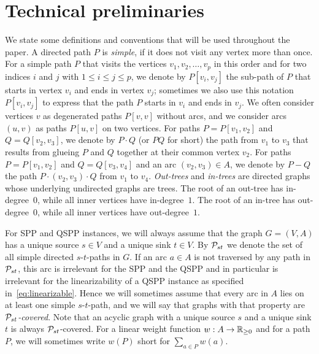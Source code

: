 \documentclass[11pt,fleqn]{article}
\begin{document}
\section{Technical preliminaries}
\label{sec:preliminearies}
We state some definitions and conventions that will be used throughout the paper.
A directed path $P$ is \emph{simple}, if it does not visit any vertex more than once.
For a simple path $P$ that visits the vertices $v_1,v_2,\ldots,v_p$ in this order and 
for two indices $i$ and $j$ with $1\le i\le j\le p$, we denote by $P[v_i,v_j]$ the 
sub-path of $P$ that starts in vertex $v_i$ and ends in vertex $v_j$;
sometimes we also use this notation $P[v_i,v_j]$ to express that the path $P$ starts 
in $v_i$ and ends in $v_j$.
We often consider vertices $v$ as degenerated paths $P[v,v]$ without arcs,
and we consider arcs $(u,v)$ as paths $P[u,v]$ on two vertices.
For paths $P=P[v_1,v_2]$ and $Q=Q[v_2,v_3]$, we denote by $P\cdot Q$ (or $PQ$ for short) the path 
from $v_1$ to $v_3$ that results from glueing $P$ and $Q$ together at their common vertex $v_2$.
For paths $P=P[v_1,v_2]$ and $Q=Q[v_3,v_4]$ and an arc $(v_2,v_3)\in A$, we denote by $P-Q$ 
the path $P\cdot(v_2,v_3)\cdot Q$ from $v_1$ to $v_4$.
\emph{Out-trees} and \emph{in-trees} are directed graphs whose underlying undirected graphs are trees.
The root of an out-tree has  in-degree~$0$, while all inner vertices have  in-degree~$1$.
The root of an  in-tree has out-degree~$0$, while all inner vertices have out-degree~$1$.

For SPP and QSPP instances, we will always assume that the graph $G=(V,A)$ has a unique source $s\in V$ 
and a unique sink $t\in V$. 
By ${\cal P}_{st}$ we denote the set of all simple directed $s$-$t$-paths in $G$.
If an arc $a\in A$ is not traversed by any path in ${\cal P}_{st}$, this arc is irrelevant for
the SPP and the QSPP and in particular is irrelevant for the linearizability of a QSPP 
instance as specified in~\eqref{eq:linearizable}.
Hence we will sometimes assume that every arc in $A$ lies on at least one simple $s$-$t$-path,
and we will say that graphs with that property are \emph{${\cal P}_{st}$-covered}.
Note that an acyclic graph with a unique source $s$ and a unique sink $t$ is always ${\cal P}_{st}$-covered.
For a linear weight function $w:A\to{\mathbb{R}_{\ge0}}$ and for a path $P$, we will sometimes write $w(P)$
short for $\sum_{a\in P}w(a)$.


\medskip
\end{document}
